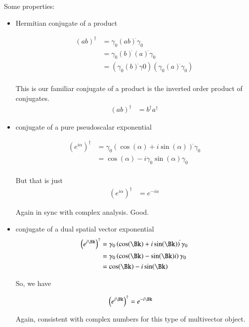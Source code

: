\documentclass{article}
\begin{document}
Some properties:
\begin{itemize}
\item Hermitian conjugate of a product

\begin{align*}
(ab)^\dagger 
&= \gamma_0 (ab)^{\tilde{}} \gamma_0 \\
&= \gamma_0 
(b)^{\tilde{}}
(a)^{\tilde{}}
\gamma_0 \\
&= \left(\gamma_0 (b)^{\tilde{}} \gamma0\right) \left(\gamma_0 (a)^{\tilde{}} \gamma_0\right) \\
\end{align*}

This is our familiar conjugate of a product is the inverted order product of conjugates.
\begin{align}
(ab)^\dagger &= b^\dagger a^\dagger 
\end{align}

\item conjugate of a pure pseudoscalar exponential

\begin{align*}
\left(e^{i\alpha}\right)^\dagger
&=
\gamma_0
\left(
\cos(\alpha)
+ i \sin(\alpha)
\right)^{\tilde{}}
\gamma_0 \\
&=
\cos(\alpha)
- i 
\gamma_0
\sin(\alpha)
\gamma_0 \\
\end{align*}

But that is just
\begin{align}
\left(e^{i\alpha}\right)^\dagger &= e^{-i\alpha}
\end{align}

Again in sync with complex analysis.  Good.

\item conjugate of a dual spatial vector exponential
\begin{align*}
\left(e^{i\Bk}\right)^\dagger
&=
\gamma_0
\left(
\cos(\Bk)
+ i \sin(\Bk)
\right)^{\tilde{}}
\gamma_0 \\
&=
\gamma_0
\left(
\cos(\Bk)
- \sin(\Bk) i
\right)
\gamma_0 \\
&=
\cos(\Bk)
- i\sin(\Bk) 
\end{align*}

So, we have

\begin{align}
\left(e^{i\Bk}\right)^\dagger &= e^{-i\Bk}
\end{align}

Again, consistent with complex numbers for this type of multivector object.


\end{itemize}
\end{document}
